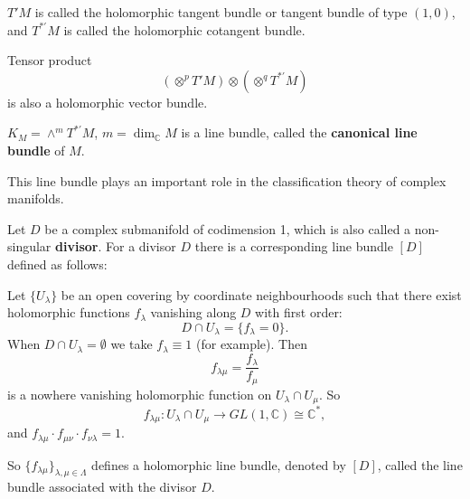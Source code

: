 \(T'M\) is called the holomorphic tangent bundle or tangent bundle of type \((1,0)\),
and \(T^{*\prime}M\) is called the holomorphic cotangent bundle.

\begin{example}
  Tensor product \[
    (\otimes^p T'M)\otimes (\otimes^q T^{*\prime}M)
  \] is also a holomorphic vector bundle.
\end{example}

\begin{definition}
  \(K_M=\wedge^m T^{*\prime}M\), \(m=\dim_{\mathbb{C}}M\) is a line bundle, called the
  \textbf{canonical line bundle} of \(M\).
  
  This line bundle plays an important role in the classification theory of complex 
  manifolds.
\end{definition}

Let \(D\) be a complex submanifold of codimension 1, which is also called a
non-singular \textbf{divisor}. For a divisor \(D\) there is a corresponding line
bundle \([D]\) defined as follows:

Let \(\{U_\lambda\}\) be an open covering by coordinate neighbourhoods such that there 
exist holomorphic functions \(f_\lambda\) vanishing along \(D\) with first order: \[
  D\cap U_\lambda=\{f_\lambda=0\}
.\] When \(D\cap U_\lambda=\emptyset\) we take \(f_\lambda\equiv 1\) (for example).
Then \[
  f_{\lambda\mu}=\frac{f_\lambda}{f_\mu}
\] is a nowhere vanishing holomorphic function on \(U_\lambda\cap U_\mu\). So \[
  f_{\lambda\mu}\colon U_\lambda\cap U_\mu\longrightarrow GL(1,\mathbb{C})\cong
  \mathbb{C}^*
,\] and \(f_{\lambda\mu}\cdot f_{\mu\nu}\cdot f_{\nu\lambda}=1\).

So \(\{f_{\lambda\mu}\}_{\lambda,\mu\in \Lambda}\) defines a holomorphic line bundle,
denoted by \([D]\), called the line bundle associated with the divisor \(D\).

